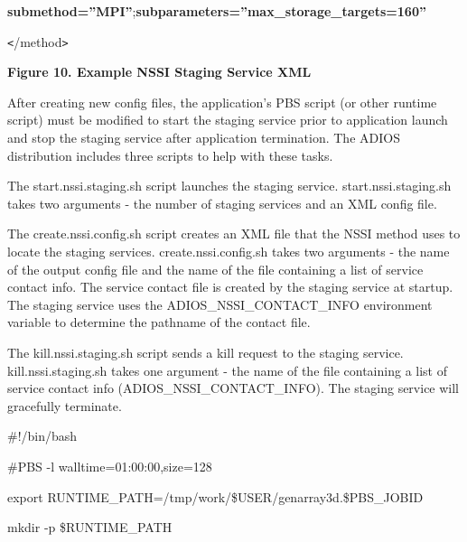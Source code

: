 \vspace{6pt}
\textbf{submethod=''MPI''};\textbf{subparameters=''max\_storage\_targets=160''}

\vspace{6pt}
\texttt{<}/method\texttt{>}

\label{HToc144350169}

\vspace{18pt}
{\color{color20} \textbf{Figure 10. Example NSSI Staging Service XML}}

\vspace{6pt}
\leftskip=0pt
After creating new config files, the application's PBS script (or other runtime 
script) must be modified to start the staging service prior to application launch 
and stop the staging service after application termination. The ADIOS distribution 
includes three scripts to help with these tasks.

\vspace{6pt}
The start.nssi.staging.sh script launches the staging service.  start.nssi.staging.sh 
takes two arguments - the number of staging services and an XML config file.

\vspace{6pt}
The create.nssi.config.sh script creates an XML file that the NSSI method uses 
to locate the staging services.  create.nssi.config.sh takes two arguments - the 
name of the output config file and the name of the file containing a list of service 
contact info.  The service contact file is created by the staging service at startup. 
 The staging service uses the ADIOS\_NSSI\_CONTACT\_INFO environment variable to 
determine the pathname of the contact file.

\vspace{6pt}
The kill.nssi.staging.sh script sends a kill request to the staging service.  kill.nssi.staging.sh 
 takes one argument - the name of the file containing a list of service contact 
info (ADIOS\_NSSI\_CONTACT\_INFO).  The staging service will gracefully terminate.


\vspace{18pt}
{\small \#!/bin/bash}

\vspace{6pt}
{\small \#PBS -l walltime=01:00:00,size=128}

\vspace{18pt}
{\small export RUNTIME\_PATH=/tmp/work/\$USER/genarray3d.\$PBS\_JOBID}

\vspace{6pt}
{\small mkdir -p \$RUNTIME\_PATH}

